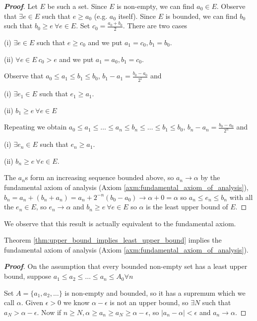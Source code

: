 \begin{proof}[\bf Proof]
Let $E$ be such a set. Since $E$ is non-empty, we can find $a_0 \in E$. Observe that $\exists e \in E$ such that $e \geq a_0$ (e.g. $a_0$ itself). Since $E$ is bounded, we can find $b_0$ such that $b_0 \geq e \ \forall e \in E$. Set $c_0 = \frac{a_0 + b_0}{2}$. There are two cases
\ben
\item [(i)] $\exists e \in E$ such that $e \geq c_0$ and we put $a_1 = c_0, b_1 = b_0$.
\item [(ii)] $\forall e \in E \ c_0 > e$ and we put $a_1 = a_0, b_1 = c_0$.
\een

Observe that $a_0 \leq a_1 \leq b_1 \leq b_0$, $b_1 - a_1 = \frac{b_0 - a_0}{2^1}$ and 
\ben 
\item [(i)] $\exists e_1 \in E$ such that $e_1 \geq a_1$.
\item [(ii)] $b_1 \geq e \ \forall e \in E$
\een

Repeating we obtain $a_0 \leq a_1  \leq \ldots \leq a_n \leq b_n \leq \ldots \leq b_1 \leq b_0$, $b_n - a_n = \frac{b_0 - a_0}{2^n}$ and 
\ben
\item [(i)] $\exists e_n \in E$ such that $e_n \geq a_1$.
\item [(ii)] $b_n \geq e \ \forall e \in E$.
\een

The $a_n$s form an increasing sequence bounded above, so $a_n \rightarrow \alpha$ by the fundamental axiom of analysis (Axiom \ref{axm:fundamental_axiom_of_analysis}), $b_n = a_n + (b_n + a_n) = a_n + 2^{-n} (b_0 - a_0) \rightarrow \alpha + 0 = \alpha$ so $a_n \leq e_n \leq b_n$ with all the $e_n \in E$, so $e_n \rightarrow \alpha$ and $b_n \geq e \ \forall e \in E$ so $\alpha$ is the least upper bound of $E$.
\end{proof}


We observe that this result is actually equivalent to the fundamental axiom.

\begin{theorem}\label{thm:least_upper_bound_existence_implies_fundamental_axiom_of_analysis}
Theorem \ref{thm:upper_bound_implies_least_upper_bound} implies the fundamental axiom of analysis (Axiom \ref{axm:fundamental_axiom_of_analysis}).
\end{theorem}

\begin{proof}[\bf Proof]
On the assumption that every bounded non-empty set has a least upper bound, suppose $a_1 \leq a_2 \leq \ldots \leq a_n \leq A_0 \forall n$

Set $A = \{a_1, a_2, \ldots \}$ is non-empty and bounded, so it has a supremum which we call $\alpha$. Given $\epsilon > 0$ we know $\alpha - \epsilon$ is not an upper bound, so $\exists N$ such that $a_N > \alpha - \epsilon$. Now if $n \geq N, \alpha \geq a_n \geq a_N \geq \alpha - \epsilon$, so $|a_n - \alpha| < \epsilon$ and $a_n \rightarrow \alpha$.
\end{proof}


